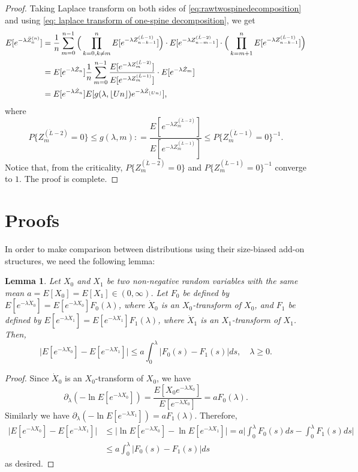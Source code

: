 \documentclass[12pt,a4paper]{amsart}
\DeclarePairedDelimiter\floor{\lfloor}{\rfloor}
\newtheorem{lem}[thm]{Lemma}
\numberwithin{equation}{section}
\begin{document}
\begin{proof}
	Taking Laplace transform on both sides of \eqref{eq:rawtwospinedecomposition}  and using \eqref{eq: laplace transform of one-spine decomposition}, we get
\begin{equation} \label{eq:laplacetransformationoftwospinedecomposition} \begin{split}
	E [ e^{- \lambda \ddot Z_n^{(n)}} ]
	&= \frac{1}{n}\sum_{m=0}^{n-1} \Big( \prod_{k=0,k\neq m}^{n} E[e^{-\lambda Z^{(\dot L - 1)}_{n-k-1}}] \Big) \cdot E [e^{-\lambda Z^{(\ddot L - 2)}_{n-m-1}}] \cdot \Big(\prod_{k= m+1}^n E [e^{-\lambda Z^{(\dot L - 1)}_{n-k-1}}]\Big)
	\\&= E [e^{-\lambda \dot Z_n}]  \frac{1}{n}\sum_{m=0}^{n-1}   \frac{ E [e^{-\lambda Z^{(\ddot L - 2)}_{m}}] }{ E[e^{-\lambda Z^{(\dot L - 1)}_{m}}] } \cdot E[e^{- \lambda \dot Z_{m}}]
	\\&= E [e^{-\lambda \dot Z_n}] E[g(\lambda, \floor{Un})e^{-\lambda \dot Z_{\floor{Un}}}],
\end{split}
\end{equation}
	where
\[
	P\{Z^{(\ddot L - 2)}_m=0\}
	\leq	g(\lambda,m)
	: = \frac{ E [e^{-\lambda Z^{(\ddot L - 2)}_{m}}] }{ E[e^{-\lambda Z^{(\dot L - 1)}_{m}}] }
	\leq P\{Z^{(\dot L - 1)}_m = 0\}^{-1}.
\]
	Notice that, from the criticality, $P\{Z^{(\ddot L - 2)}_m=0\}$ and $P\{Z^{(\dot L - 1)}_m = 0\}^{-1}$ converge to $1$.
	The proof is complete.
\end{proof}



\section{Proofs}
\label{sec: proofs}


In order to make comparison between distributions using their size-biased add-on structures, we need the following lemma:
\begin{lem}\label{lem: compare}
	Let $X_0$ and $X_1$ be two non-negative random variables with the same mean $a = E[X_0] = E[X_1] \in (0,\infty)$.
	Let $F_0$ be defined by $E[e^{-\lambda \dot X_0}] = E[e^{-\lambda X_0}] F_0(\lambda)$,  
	where $\dot X_0$ is an $X_0$-transform of $X_0$,
	and $F_1$ be defined by $E[e^{-\lambda \dot X_1}] = E[e^{-\lambda X_1}] F_1(\lambda)$, 
	where $\dot X_1$ is an $X_1$-transform of $X_1$.
	Then,
	\[
  \big| E[e^{-\lambda X_0}] - E[e^{-\lambda X_1}] \big| 
\leq a \int_0^\lambda| F_0(s) - F_1(s) |ds, \quad \lambda \geq 0.
	\]
\end{lem}
\begin{proof}
	Since $\dot X_0$ is an $X_0$-transform of $X_0$, 
we have
	\[
	\partial_\lambda ( -\ln E[e^{-\lambda X_0}]) = \frac { E[X_0 e^{-\lambda X_0}]}{ E[e^{-\lambda X_0}] }
	= a F_0(\lambda).
	\]
	Similarly we have $\partial_\lambda ( -\ln E[e^{-\lambda X_1}]) = a F_1(\lambda)$.
	Therefore,
	\[\begin{split}
    \big| E[e^{-\lambda X_0}] - E[e^{-\lambda X_1}] \big|
	&\leq \big| \ln E[e^{-\lambda X_0}] - \ln E[e^{-\lambda X_1}] \big|
	= a\big| \int_0^\lambda F_0(s)ds - \int_0^\lambda F_1(s)ds \big|
	\\& \leq a \int_0^\lambda| F_0(s) - F_1(s) |ds
	\end{split}\]
	as desired.
\end{proof}
\end{document}
